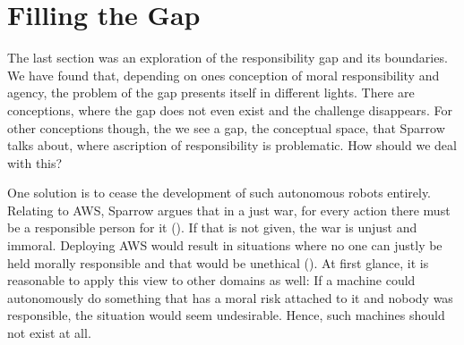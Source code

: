\documentclass{article}
\newcounter{example}
\begin{document}
%
%
%
%

\section{Filling the Gap}

The last section was an exploration of the responsibility gap and its
boundaries. We have found that, depending on ones conception of moral
responsibility and agency, the problem of the gap presents itself in different
lights. There are conceptions, where the gap does not even exist and the
challenge disappears. For other conceptions though, the we see a gap, the
conceptual space, that Sparrow talks about, where ascription of responsibility
is problematic. How should we deal with this?

One solution is to cease the development of such autonomous robots entirely.
Relating to AWS, Sparrow argues that in a just war, for every action there must be a
responsible person for it (\cite[p. 67]{sparrow2007killer}). If that is not
given, the war is unjust and immoral. Deploying AWS would result in situations
where no one can justly be held morally responsible and that would be unethical
(\cite[p. 74]{sparrow2007killer}). At first glance, it is reasonable to apply
this view to other domains as well: If a machine could autonomously do something
that has a moral risk attached to it and nobody was responsible, the situation
would seem undesirable. Hence, such machines should not exist at all.\\
\end{document}
